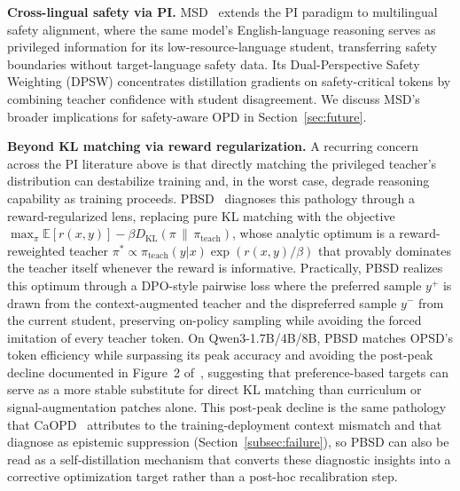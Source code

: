 \documentclass{article} %
\newcommand{\E}{\mathbb{E}}
\begin{document}
\textbf{Cross-lingual safety via PI.} MSD~\citep{qin2026msd} extends the PI paradigm to multilingual safety alignment, where the same model's English-language reasoning serves as privileged information for its low-resource-language student, transferring safety boundaries without target-language safety data. Its Dual-Perspective Safety Weighting (DPSW) concentrates distillation gradients on safety-critical tokens by combining teacher confidence with student disagreement. We discuss MSD's broader implications for safety-aware OPD in Section~\ref{sec:future}.

\textbf{Beyond KL matching via reward regularization.} A recurring concern across the PI literature above is that directly matching the privileged teacher's distribution can destabilize training and, in the worst case, degrade reasoning capability as training proceeds. PBSD~\citep{pbsd2026} diagnoses this pathology through a reward-regularized lens, replacing pure KL matching with the objective $\max_{\pi} \E[r(x,y)] - \beta D_{\mathrm{KL}}(\pi \,\|\, \pi_{\text{teach}})$, whose analytic optimum is a reward-reweighted teacher $\pi^* \propto \pi_{\text{teach}}(y|x) \exp(r(x,y)/\beta)$ that provably dominates the teacher itself whenever the reward is informative. Practically, PBSD realizes this optimum through a DPO-style pairwise loss where the preferred sample $y^+$ is drawn from the context-augmented teacher and the dispreferred sample $y^-$ from the current student, preserving on-policy sampling while avoiding the forced imitation of every teacher token. On Qwen3-1.7B/4B/8B, PBSD matches OPSD's token efficiency while surpassing its peak accuracy and avoiding the post-peak decline documented in Figure~2 of~\citet{pbsd2026}, suggesting that preference-based targets can serve as a more stable substitute for direct KL matching than curriculum or signal-augmentation patches alone. This post-peak decline is the same pathology that CaOPD~\citep{2604.16830} attributes to the training-deployment context mismatch and that~\citet{2603.24472} diagnose as epistemic suppression (Section~\ref{subsec:failure}), so PBSD can also be read as a self-distillation mechanism that converts these diagnostic insights into a corrective optimization target rather than a post-hoc recalibration step.
\end{document}
